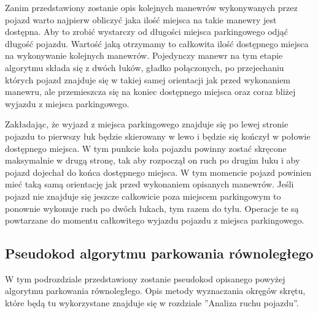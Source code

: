 \documentclass[a4paper,11pt,twoside]{report}
\theoremstyle{definition}
\begin{document}
Zanim przedstawiony zostanie opis kolejnych manewrów wykonywanych przez pojazd warto najpierw  obliczyć jaka ilość miejsca na takie manewry jest dostępna. Aby to zrobić wystarczy od długości miejsca parkingowego odjąć długość pojazdu. Wartość jaką otrzymamy to całkowita ilość dostępnego miejsca na wykonywanie kolejnych manewrów. Pojedynczy manewr na tym etapie algorytmu składa się z dwóch łuków, gładko połączonych, po przejechaniu których pojazd znajduje się w takiej samej orientacji jak przed wykonaniem manewru, ale przemieszcza się na koniec dostępnego miejsca oraz coraz bliżej wyjazdu z miejsca parkingowego.

Zakładając, że wyjazd z miejsca parkingowego znajduje się po lewej stronie pojazdu to pierwszy łuk będzie skierowany w lewo i będzie się kończył w połowie dostępnego miejsca. W tym punkcie koła pojazdu powinny zostać skręcone maksymalnie w drugą stronę, tak aby rozpoczął on ruch po drugim łuku i aby pojazd dojechał do końca dostępnego miejsca. W tym momencie pojazd powinien mieć taką samą orientację jak przed wykonaniem opisanych manewrów. Jeśli pojazd nie znajduje się jeszcze całkowicie poza miejscem parkingowym to ponownie wykonuje ruch po dwóch łukach, tym razem do tyłu. Operacje te są powtarzane do momentu całkowitego wyjazdu pojazdu z miejsca parkingowego.

\subsection{Pseudokod algorytmu parkowania równoległego}

W tym podrozdziale przedstawiony zostanie pseudokod opisanego powyżej algorytmu parkowania równoległego. Opis metody wyznaczania okręgów skrętu, które będą tu wykorzystane znajduje się w rozdziale ''Analiza ruchu pojazdu''.
\end{document}
